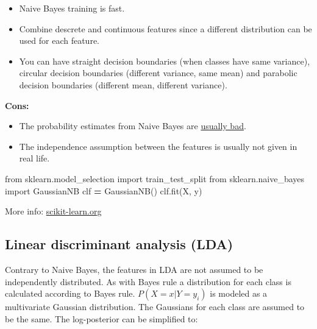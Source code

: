 \documentclass[
]{book}
\newenvironment{Shaded}{\begin{snugshade}}{\end{snugshade}}
\newcommand{\ImportTok}[1]{#1}
\newcommand{\NormalTok}[1]{#1}
\newcommand{\OperatorTok}[1]{\textcolor[rgb]{0.81,0.36,0.00}{\textbf{#1}}}
\begin{document}
\begin{itemize}
\item
  Naive Bayes training is fast.
\item
  Combine descrete and continuous features since a different
  distribution can be used for each feature.
\item
  You can have straight decision boundaries (when classes have same
  variance), circular decision boundaries (different variance, same
  mean) and parabolic decision boundaries (different mean, different
  variance).
\end{itemize}

\textbf{Cons:}

\begin{itemize}
\item
  The probability estimates from Naive Bayes are \href{https://scikit-learn.org/stable/modules/naive_bayes.html\#naive-bayes}{usually
  bad}.
\item
  The independence assumption between the features is usually not
  given in real life.
\end{itemize}

\begin{Shaded}
\begin{Highlighting}[]
\ImportTok{from}\NormalTok{ sklearn.model\_selection }\ImportTok{import}\NormalTok{ train\_test\_split}
\ImportTok{from}\NormalTok{ sklearn.naive\_bayes }\ImportTok{import}\NormalTok{ GaussianNB}
\NormalTok{clf }\OperatorTok{=}\NormalTok{ GaussianNB()}
\NormalTok{clf.fit(X, y)}
\end{Highlighting}
\end{Shaded}

More info:
\href{https://scikit-learn.org/stable/modules/generated/sklearn.naive_bayes.GaussianNB.html}{scikit-learn.org}\\

\hypertarget{linear-discriminant-analysis-lda}{%
\subsection{Linear discriminant analysis (LDA)}\label{linear-discriminant-analysis-lda}}

Contrary to Naive Bayes, the features in LDA are not assumed to be
independently distributed. As with Bayes rule a distribution for each
class is calculated according to Bayes rule. \(P(X=x|Y=y_i)\) is modeled
as a multivariate Gaussian distribution. The Gaussians for each class
are assumed to be the same. The log-posterior can be simplified to:
\end{document}
